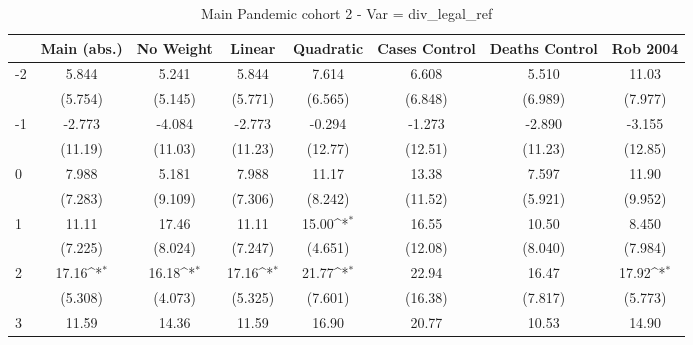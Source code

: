 \documentclass{article}
\begin{document}
{
\def\sym#1{\ifmmode^{#1}\else\(^{#1}\)\fi}
\begin{longtable}{l*{7}{c}}
\caption{Main Pandemic cohort 2 - Var = div\_legal\_ref}\\
\hline\hline\endfirsthead\hline\endhead\hline\endfoot\endlastfoot
                &\multicolumn{1}{c}{Main (abs.)}&\multicolumn{1}{c}{No Weight}&\multicolumn{1}{c}{Linear}&\multicolumn{1}{c}{Quadratic}&\multicolumn{1}{c}{Cases Control}&\multicolumn{1}{c}{Deaths Control}&\multicolumn{1}{c}{Rob 2004}\\
\hline
-2              &    5.844         &    5.241         &    5.844         &    7.614         &    6.608         &    5.510         &    11.03         \\
                &  (5.754)         &  (5.145)         &  (5.771)         &  (6.565)         &  (6.848)         &  (6.989)         &  (7.977)         \\
-1              &   -2.773         &   -4.084         &   -2.773         &   -0.294         &   -1.273         &   -2.890         &   -3.155         \\
                &  (11.19)         &  (11.03)         &  (11.23)         &  (12.77)         &  (12.51)         &  (11.23)         &  (12.85)         \\
0               &    7.988         &    5.181         &    7.988         &    11.17         &    13.38         &    7.597         &    11.90         \\
                &  (7.283)         &  (9.109)         &  (7.306)         &  (8.242)         &  (11.52)         &  (5.921)         &  (9.952)         \\
1               &    11.11         &    17.46         &    11.11         &    15.00\sym{*}  &    16.55         &    10.50         &    8.450         \\
                &  (7.225)         &  (8.024)         &  (7.247)         &  (4.651)         &  (12.08)         &  (8.040)         &  (7.984)         \\
2               &    17.16\sym{*}  &    16.18\sym{*}  &    17.16\sym{*}  &    21.77\sym{*}  &    22.94         &    16.47         &    17.92\sym{*}  \\
                &  (5.308)         &  (4.073)         &  (5.325)         &  (7.601)         &  (16.38)         &  (7.817)         &  (5.773)         \\
3               &    11.59         &    14.36         &    11.59         &    16.90         &    20.77         &    10.53         &    14.90         \\

\end{longtable}}
\end{document}
